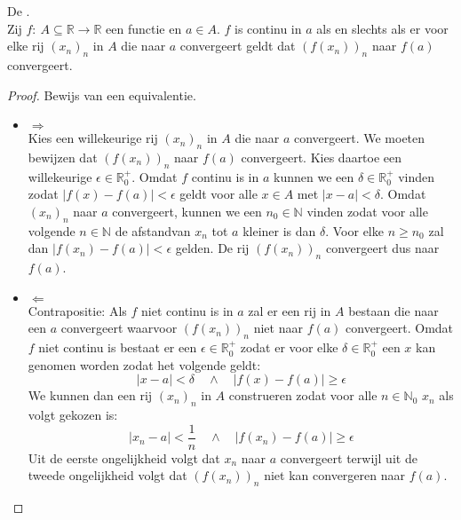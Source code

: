 \documentclass[main.tex]{subfiles}
\begin{document}
\begin{bpr}
  De .\\
  \label{pr:continu-asa-behoudt-convergentie}
  Zij $f:\ A \subseteq \mathbb{R} \rightarrow \mathbb{R}$ een functie en $a\in A$.
  $f$ is continu in $a$ als en slechts als er voor elke rij $(x_{n})_{n}$ in $A$ die naar $a$ convergeert geldt dat $(f(x_{n}))_{n}$ naar $f(a)$ convergeert.

  \begin{proof}
    Bewijs van een equivalentie.
    \begin{itemize}
    \item $\Rightarrow$\\
      Kies een willekeurige rij $(x_{n})_{n}$ in $A$ die naar $a$ convergeert.
      We moeten bewijzen dat $(f(x_{n}))_{n}$ naar $f(a)$ convergeert.
      Kies daartoe een willekeurige $\epsilon \in \mathbb{R}_{0}^{+}$.
      Omdat $f$ continu is in $a$ kunnen we een $\delta\in \mathbb{R}_{0}^{+}$ vinden zodat $|f(x)-f(a)| < \epsilon$ geldt voor alle $x\in A$ met $|x-a| < \delta$.
      Omdat $(x_{n})_{n}$ naar $a$ convergeert, kunnen we een $n_{0}\in \mathbb{N}$ vinden zodat voor alle volgende $n\in\mathbb{N}$ de afstandvan $x_{n}$ tot $a$ kleiner is dan $\delta$.
      Voor elke $n\ge n_{0}$ zal dan $|f(x_{n})-f(a)| < \epsilon$ gelden.
      De rij $(f(x_{n}))_{n}$ convergeert dus naar $f(a)$.
    \item $\Leftarrow$\\
      Contrapositie: Als $f$ niet continu is in $a$ zal er een rij in $A$ bestaan die naar een $a$ convergeert waarvoor $(f(x_{n}))_{n}$ niet naar $f(a)$ convergeert.
      Omdat $f$ niet continu is bestaat er een $\epsilon \in \mathbb{R}_{0}^{+}$ zodat er voor elke $\delta\in \mathbb{R}_{0}^{+}$ een $x$ kan genomen worden zodat het volgende geldt:
      \[ |x-a| < \delta \quad\wedge\quad |f(x)-f(a)| \ge \epsilon \]
      We kunnen dan een rij $(x_{n})_{n}$ in $A$ construeren zodat voor alle $n\in\mathbb{N}_{0}$ $x_{n}$ als volgt gekozen is:
      \[ |x_{n}-a| < \frac{1}{n} \quad\wedge\quad |f(x_{n})-f(a)| \ge \epsilon \]
      Uit de eerste ongelijkheid volgt dat $x_{n}$ naar $a$ convergeert terwijl uit de tweede ongelijkheid volgt dat $(f(x_{n}))_{n}$ niet kan convergeren naar $f(a)$.
    \end{itemize}
  \end{proof}
\end{bpr}
\end{document}
